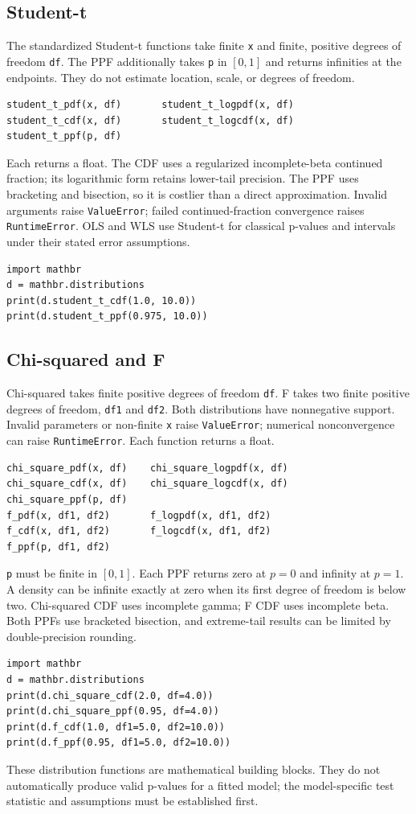 \documentclass[11pt,a4paper]{article}
\begin{document}
\subsection{Student-t}
The standardized Student-t functions take finite \verb|x| and finite, positive degrees of freedom \verb|df|. The PPF additionally takes \verb|p| in $[0,1]$ and returns infinities at the endpoints. They do not estimate location, scale, or degrees of freedom.
\begin{verbatim}
student_t_pdf(x, df)       student_t_logpdf(x, df)
student_t_cdf(x, df)       student_t_logcdf(x, df)
student_t_ppf(p, df)
\end{verbatim}
Each returns a float. The CDF uses a regularized incomplete-beta continued fraction; its logarithmic form retains lower-tail precision. The PPF uses bracketing and bisection, so it is costlier than a direct approximation. Invalid arguments raise \verb|ValueError|; failed continued-fraction convergence raises \verb|RuntimeError|. OLS and WLS use Student-t for classical p-values and intervals under their stated error assumptions.
\begin{verbatim}
import mathbr
d = mathbr.distributions
print(d.student_t_cdf(1.0, 10.0))
print(d.student_t_ppf(0.975, 10.0))
\end{verbatim}

\subsection{Chi-squared and F}
Chi-squared takes finite positive degrees of freedom \verb|df|. F takes two finite positive degrees of freedom, \verb|df1| and \verb|df2|. Both distributions have nonnegative support. Invalid parameters or non-finite \verb|x| raise \verb|ValueError|; numerical nonconvergence can raise \verb|RuntimeError|. Each function returns a float.
\begin{verbatim}
chi_square_pdf(x, df)    chi_square_logpdf(x, df)
chi_square_cdf(x, df)    chi_square_logcdf(x, df)
chi_square_ppf(p, df)
f_pdf(x, df1, df2)       f_logpdf(x, df1, df2)
f_cdf(x, df1, df2)       f_logcdf(x, df1, df2)
f_ppf(p, df1, df2)
\end{verbatim}
\verb|p| must be finite in $[0,1]$. Each PPF returns zero at $p=0$ and infinity at $p=1$. A density can be infinite exactly at zero when its first degree of freedom is below two. Chi-squared CDF uses incomplete gamma; F CDF uses incomplete beta. Both PPFs use bracketed bisection, and extreme-tail results can be limited by double-precision rounding.
\begin{verbatim}
import mathbr
d = mathbr.distributions
print(d.chi_square_cdf(2.0, df=4.0))
print(d.chi_square_ppf(0.95, df=4.0))
print(d.f_cdf(1.0, df1=5.0, df2=10.0))
print(d.f_ppf(0.95, df1=5.0, df2=10.0))
\end{verbatim}
These distribution functions are mathematical building blocks. They do not automatically produce valid p-values for a fitted model; the model-specific test statistic and assumptions must be established first.
\end{document}
